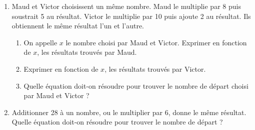 \begin{minipage}{0.99\linewidth}

\exo

\begin{enumerate}
\item Maud et Victor choisissent un même nombre. Maud le multiplie par 8 puis soustrait 5 au résultat. Victor le multiplie par 10 puis ajoute 2 au résultat. Ils obtiennent le même résultat l'un et l'autre.

\begin{enumerate}
\item On appelle $x$ le nombre choisi par Maud et Victor. Exprimer en fonction de $x$, les résultats trouvés par Maud.
\item Exprimer en fonction de $x$, les résultats trouvés par Victor.

\item Quelle équation doit-on résoudre pour trouver le nombre de départ choisi par Maud et Victor ?

\end{enumerate}

\item Additionner 28 à un nombre, ou le multiplier par 6, donne le même résultat. Quelle équation doit-on résoudre pour trouver le nombre de départ ?
 
\end{enumerate}

\end{minipage}

\vspace{0.5cm}
